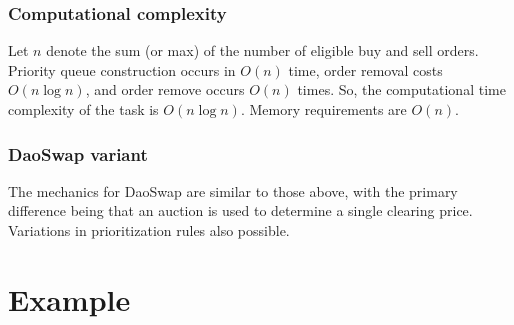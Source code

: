\documentclass[11pt, reqno]{amsart}
\begin{document}
\subsubsection{Computational complexity}

Let $n$ denote the sum (or max) of the number of eligible buy and sell orders.
Priority queue construction occurs in $O(n)$ time, order removal costs
$O(n \log n)$, and order remove occurs $O(n)$ times. So, the computational
time complexity of the task is $O(n \log n)$. Memory requirements are $O(n)$.

\subsubsection{DaoSwap variant}
The mechanics for DaoSwap are similar to those above, with the primary
difference being that an auction is used to determine a single clearing price.
Variations in prioritization rules also possible.

\section{Example}



\end{document}

